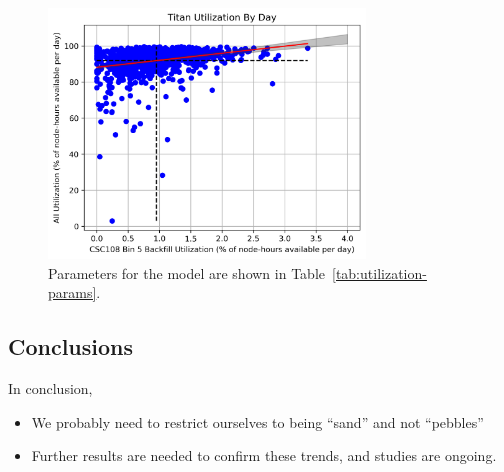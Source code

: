 \begin{figure}
  \includegraphics[width=0.75\textwidth]{images/linfit-utilization-by-true-day-bin5.png}
\caption{Parameters for the model are shown in
    Table~\ref{tab:utilization-params}.}
\label{fig:utilization-bin5}
\end{figure}


\subsection{Conclusions}
\label{subsec:sec4-conclusions}

In conclusion,
\begin{itemize}
    \item We probably need to restrict ourselves to being ``sand'' and not
        ``pebbles''
    \item Further results are needed to confirm these trends, and studies are
        ongoing.
\end{itemize}


